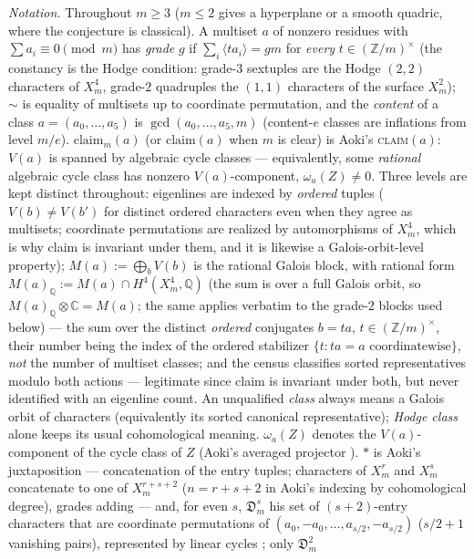 \documentclass[11pt]{amsart}
\theoremstyle{remark}
\newcommand{\Q}{\mathbb{Q}}
\newcommand{\Z}{\mathbb{Z}}
\newcommand{\Ds}{\mathfrak{D}}
\newcommand{\fr}[1]{\langle #1\rangle}
\newcommand{\V}{V}
\newcommand{\C}{\mathbb{C}}
\begin{document}
\medskip
\noindent\emph{Notation.} Throughout $m\ge3$ ($m\le2$ gives a hyperplane or a smooth quadric,
where the conjecture is classical). A multiset $a$ of nonzero residues with $\sum a_i\equiv0\pmod m$ has
\emph{grade} $g$ if $\sum_i\fr{ta_i}=gm$ for \emph{every} $t\in(\Z/m)^\times$ (the constancy is the
Hodge condition: grade-$3$ sextuples are the Hodge $(2,2)$ characters of $X^4_m$, grade-$2$ quadruples
the $(1,1)$ characters of the surface $X^2_m$); $\sim$ is equality of multisets up to coordinate
permutation, and the \emph{content} of a class $a=(a_0,\dots,a_5)$ is $\gcd(a_0,\dots,a_5,m)$
(content-$e$ classes are
inflations from level $m/e$). $\mathrm{claim}_m(a)$ (or $\mathrm{claim}(a)$ when $m$ is clear) is Aoki's
\textsc{claim}$(a)$: $\V(a)$ is spanned by algebraic cycle classes \cite[Introduction]{Aoki87} ---
equivalently, some \emph{rational} algebraic cycle class has nonzero $\V(a)$-component,
$\omega_a(Z)\neq0$. Three levels are kept distinct throughout: eigenlines are indexed by
\emph{ordered} tuples ($\V(b)\neq\V(b')$ for distinct ordered characters even when they agree as
multisets; coordinate permutations are realized by automorphisms of $X^4_m$, which is why claim is
invariant under them, and it is likewise a Galois-orbit-level property); $M(a):=\bigoplus_b\V(b)$
is the rational Galois block, with rational form
$M(a)_\Q:=M(a)\cap H^4(X^4_m,\Q)$ (the sum is over a full Galois orbit, so
$M(a)_\Q\otimes\C=M(a)$; the same applies verbatim to the grade-$2$ blocks used below) --- the sum over the distinct \emph{ordered} conjugates $b=ta$,
$t\in(\Z/m)^\times$, their number being the index of the ordered stabilizer
$\{t:ta=a\text{ coordinatewise}\}$, \emph{not} the number of multiset classes; and the census
classifies sorted representatives modulo both actions --- legitimate since claim is invariant
under both, but never identified with an eigenline count. An unqualified \emph{class} always
means a Galois orbit of characters (equivalently its sorted canonical representative);
\emph{Hodge class} alone keeps its usual cohomological meaning. $\omega_a(Z)$ denotes the
$\V(a)$-component of the cycle class of $Z$
(Aoki's averaged projector \cite[Introduction]{Aoki87}). $*$ is Aoki's juxtaposition --- concatenation of the
entry tuples; characters of $X^r_m$ and $X^s_m$ concatenate to one of $X^{r+s+2}_m$ ($n=r+s+2$ in
Aoki's indexing by cohomological degree), grades adding \cite[\S1]{Aoki87} --- and, for even $s$, $\Ds^s_m$ his set of
$(s+2)$-entry characters that are coordinate permutations of $(a_0,-a_0,\dots,a_{s/2},-a_{s/2})$
($s/2+1$ vanishing pairs), represented by linear cycles \cite[\S1, Thm.~1-1]{Aoki87}; only $\Ds^2_m$
\end{document}
